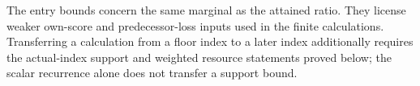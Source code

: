The entry bounds concern the same marginal as the attained ratio.
They license weaker own-score and predecessor-loss inputs used in the
finite calculations. Transferring a calculation from a floor index to
a later index additionally requires the actual-index support and weighted
resource statements proved below; the scalar recurrence alone does not
transfer a support bound.
